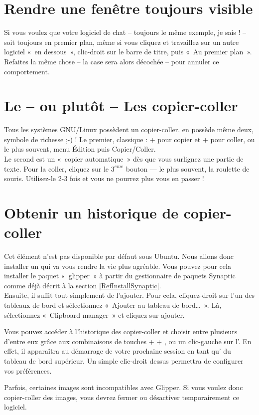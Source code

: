 \section{Rendre une fenêtre toujours visible}
Si vous voulez que votre logiciel de chat -- toujours le même exemple, je sais ! -- soit toujours en premier plan, même si vous cliquez et travaillez sur un autre logiciel «~en dessous~», clic-droit sur le barre de titre, puis «~Au premier plan~». Refaites la même chose -- la case sera alors décochée -- pour annuler ce comportement.
\section{Le -- ou plutôt -- Les copier-coller}
Tous les systèmes GNU/Linux possèdent un copier-coller.  en possède même deux, symbole de richesse ;-) ! Le premier, classique :  +  pour copier et  +  pour coller, ou le plus souvent, menu Édition puis Copier/Coller.\\
Le second est un «~copier automatique~» dès que vous surlignez une partie de texte. Pour la coller, cliquez sur le $3^{eme}$ bouton --- le plus souvent, la roulette de souris. Utilisez-le 2-3 fois et vous ne pourrez plus vous en passer !
\section{Obtenir un historique de copier-coller}
Cet élément n'est pas disponible par défaut sous Ubuntu. Nous allons donc installer un  qui va vous rendre la vie plus agréable. Vous pouvez pour cela installer le paquet «~glipper~» à partir du gestionnaire de paquets Synaptic comme déjà décrit à la section \ref{RefInstallSynaptic}.\\
Ensuite, il suffit tout simplement de l'ajouter. Pour cela, cliquez-droit sur l'un des tableaux de bord et sélectionnez «~Ajouter au tableau de bord\ldots{}~». Là, sélectionnez «~Clipboard manager~» et cliquez sur ajouter.\par
Vous pouvez accéder à l'historique des copier-coller et choisir entre plusieurs d'entre eux grâce aux combinaisons de touches  +  + , ou un clic-gauche sur l'. En effet, il apparaîtra au démarrage de votre prochaine session en tant qu' du tableau de bord supérieur. Un simple clic-droit dessus permettra de configurer vos préférences.
\begin{nota}
Parfois, certaines images sont incompatibles avec Glipper. Si vous voulez donc copier-coller des images, vous devrez fermer ou désactiver temporairement ce logiciel.
\end{nota}
